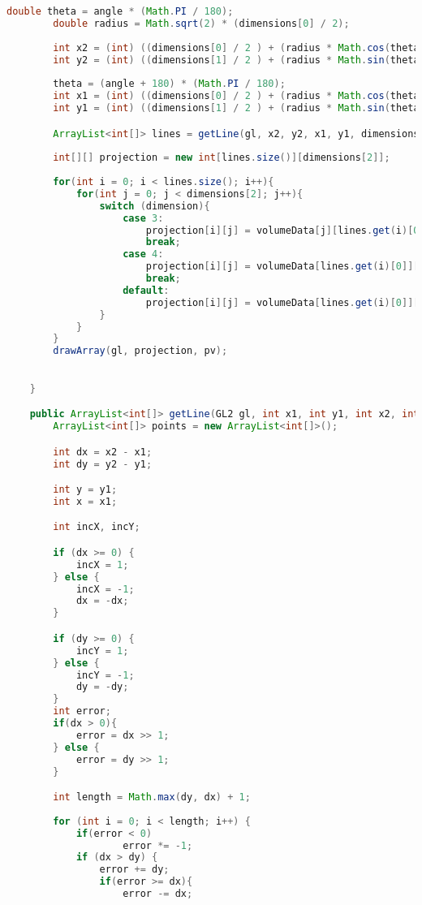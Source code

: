 \documentclass[pdftex,a4paper,10pt,titlepage]{article}
\begin{document}
\begin{lstlisting}[language=java, breaklines=true]
        double theta = angle * (Math.PI / 180);
        double radius = Math.sqrt(2) * (dimensions[0] / 2);
        
        int x2 = (int) ((dimensions[0] / 2 ) + (radius * Math.cos(theta)));
        int y2 = (int) ((dimensions[1] / 2 ) + (radius * Math.sin(theta)));
        
        theta = (angle + 180) * (Math.PI / 180);
        int x1 = (int) ((dimensions[0] / 2 ) + (radius * Math.cos(theta)));
        int y1 = (int) ((dimensions[1] / 2 ) + (radius * Math.sin(theta)));

        ArrayList<int[]> lines = getLine(gl, x2, y2, x1, y1, dimensions);
        
        int[][] projection = new int[lines.size()][dimensions[2]];
        
        for(int i = 0; i < lines.size(); i++){
            for(int j = 0; j < dimensions[2]; j++){
                switch (dimension){
                    case 3:
                        projection[i][j] = volumeData[j][lines.get(i)[0]][lines.get(i)[1]];
                        break;
                    case 4:
                        projection[i][j] = volumeData[lines.get(i)[0]][j][lines.get(i)[1]];
                        break;
                    default:
                        projection[i][j] = volumeData[lines.get(i)[0]][lines.get(i)[1]][j];
                }
            }
        }
        drawArray(gl, projection, pv);
        

    }

    public ArrayList<int[]> getLine(GL2 gl, int x1, int y1, int x2, int y2, int[] dimensions) {
        ArrayList<int[]> points = new ArrayList<int[]>();

        int dx = x2 - x1;
        int dy = y2 - y1;

        int y = y1;
        int x = x1;

        int incX, incY;

        if (dx >= 0) {
            incX = 1;
        } else {
            incX = -1;
            dx = -dx;
        }

        if (dy >= 0) {
            incY = 1;
        } else {
            incY = -1;
            dy = -dy;
        }
        int error;
        if(dx > 0){
            error = dx >> 1;
        } else {
            error = dy >> 1;
        }

        int length = Math.max(dy, dx) + 1;
        
        for (int i = 0; i < length; i++) {
            if(error < 0)
                    error *= -1;
            if (dx > dy) {
                error += dy;
                if(error >= dx){
                    error -= dx;
                    

\end{lstlisting}
\end{document}
